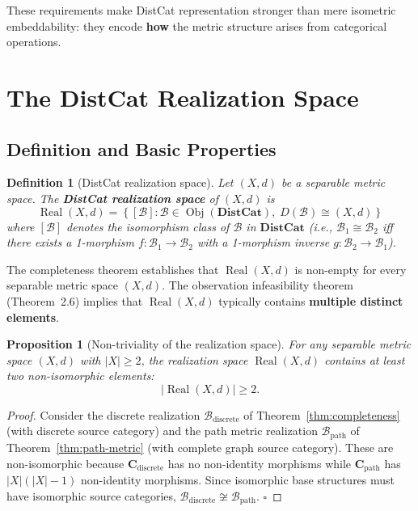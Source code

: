 \documentclass[11pt,a4paper]{article}
\newtheorem{definition}[theorem]{Definition}
\newtheorem{proposition}[theorem]{Proposition}
\begin{document}
These requirements make DistCat representation stronger than mere
isometric embeddability: they encode \textbf{how} the metric structure
arises from categorical operations.

\section{The DistCat Realization Space}

\subsection{Definition and Basic Properties}

\begin{definition}[DistCat realization space]\label{def:realization-space}
Let $(X,d)$ be a separable metric space. The \textbf{DistCat realization space}
of $(X,d)$ is
\begin{equation}
\operatorname{Real}(X,d)=\left\{[\mathcal{B}]:\mathcal{B}\in\operatorname{Obj}(\mathbf{DistCat}),
\;D(\mathcal{B})\cong(X,d)\right\}
\end{equation}
where $[\mathcal{B}]$ denotes the isomorphism class of $\mathcal{B}$ in
$\mathbf{DistCat}$ (i.e., $\mathcal{B}_1\cong\mathcal{B}_2$ iff there exists
a 1-morphism $f:\mathcal{B}_1\to\mathcal{B}_2$ with a 1-morphism inverse
$g:\mathcal{B}_2\to\mathcal{B}_1$).
\end{definition}

The completeness theorem establishes that $\operatorname{Real}(X,d)$ is
non-empty for every separable metric space $(X,d)$. The observation
infeasibility theorem (Theorem~2.6) implies that $\operatorname{Real}(X,d)$
typically contains \textbf{multiple distinct elements}.

\begin{proposition}[Non-triviality of the realization space]
For any separable metric space $(X,d)$ with $|X|\geq 2$, the realization
space $\operatorname{Real}(X,d)$ contains at least two non-isomorphic
elements:
\begin{equation}
\left|\operatorname{Real}(X,d)\right|\geq 2.
\end{equation}
\end{proposition}

\begin{proof}
Consider the discrete realization $\mathcal{B}_{\mathrm{discrete}}$ of
Theorem~\ref{thm:completeness} (with discrete source category) and the path
metric realization $\mathcal{B}_{\mathrm{path}}$ of Theorem~\ref{thm:path-metric}
(with complete graph source category). These are non-isomorphic because
$\mathbf{C}_{\mathrm{discrete}}$ has no non-identity morphisms while
$\mathbf{C}_{\mathrm{path}}$ has $|X|(|X|-1)$ non-identity morphisms.
Since isomorphic base structures must have isomorphic source categories,
$\mathcal{B}_{\mathrm{discrete}}\not\cong\mathcal{B}_{\mathrm{path}}$. $\square$
\end{proof}
\end{document}
